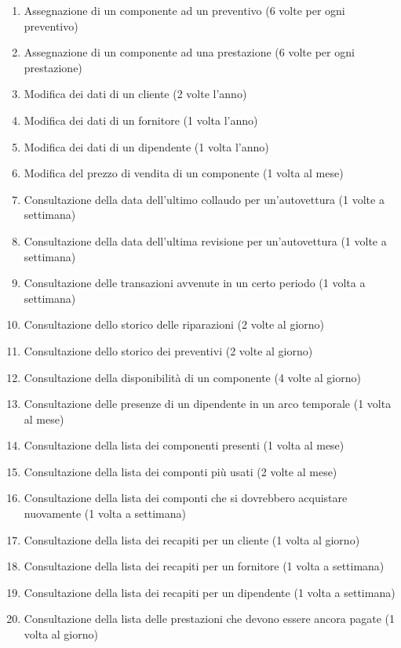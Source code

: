 \begin{enumerate}
			\item Assegnazione di un componente ad un preventivo (6 volte per ogni preventivo)
			\item Assegnazione di un componente ad una prestazione (6 volte per ogni prestazione)
			
			\item Modifica dei dati di un cliente (2 volte l’anno)
			\item Modifica dei dati di un fornitore (1 volta l’anno)
			\item Modifica dei dati di un dipendente (1 volta l’anno)
			\item Modifica del prezzo di vendita di un componente (1 volta al mese)
			
			\item Consultazione della data dell’ultimo collaudo per un’autovettura (1 volte a settimana)
			\item Consultazione della data dell’ultima revisione per un’autovettura (1 volte a settimana)
			\item Consultazione delle transazioni avvenute in un certo periodo (1 volta a settimana)
			\item Consultazione dello storico delle riparazioni (2 volte al giorno)
			\item Consultazione dello storico dei preventivi (2 volte al giorno)
			\item Consultazione della disponibilità di un componente (4 volte al giorno)
			\item Consultazione delle presenze di un dipendente in un arco temporale (1 volta al mese)
			\item Consultazione della lista dei componenti presenti (1 volta al mese)
			\item Consultazione della lista dei componti più usati (2 volte al mese)
			\item Consultazione della lista dei componti che si dovrebbero acquistare nuovamente (1 volta a settimana)
			\item Consultazione della lista dei recapiti per un cliente (1 volta al giorno)
			\item Consultazione della lista dei recapiti per un fornitore (1 volta a settimana)
			\item Consultazione della lista dei recapiti per un dipendente (1 volta a settimana)
			\item Consultazione della lista delle prestazioni che devono essere ancora pagate (1 volta al giorno)

\end{enumerate}
